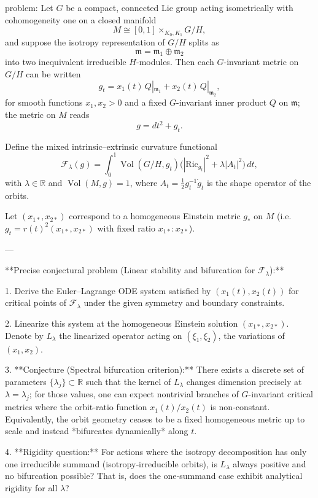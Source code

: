 problem:  
Let \(G\) be a compact, connected Lie group acting isometrically with cohomogeneity one on a closed manifold  
\[
M \cong [0,1]\times_{K_0,K_1} G/H,
\]
and suppose the isotropy representation of \(G/H\) splits as
\[
\mathfrak{m} = \mathfrak{m}_1 \oplus \mathfrak{m}_2
\]
into two inequivalent irreducible \(H\)-modules.  
Then each \(G\)-invariant metric on \(G/H\) can be written  
\[
g_t = x_1(t)\, Q|_{\mathfrak{m}_1} + x_2(t)\, Q|_{\mathfrak{m}_2},
\]
for smooth functions \(x_1,x_2>0\) and a fixed \(G\)-invariant inner product \(Q\) on \(\mathfrak{m}\); the metric on \(M\) reads
\[
g = dt^2 + g_t .
\]

Define the mixed intrinsic–extrinsic curvature functional
\[
\mathcal{F}_\lambda(g) = \int_0^1 \! \operatorname{Vol}(G/H,g_t) \Big( |\mathrm{Ric}_{g_t}|^2 + 
   \lambda |A_t|^2 \Big)\,dt,
\]
with \(\lambda \in \mathbb{R}\) and \(\operatorname{Vol}(M,g)=1\),  
where \(A_t=\frac12 g_t^{-1}\dot g_t\) is the shape operator of the orbits.

Let \((x_{1*},x_{2*})\) correspond to a homogeneous Einstein metric \(g_*\) on \(M\)
(i.e. \(g_t = r(t)^2(x_{1*},x_{2*})\) with fixed ratio \(x_{1*}:x_{2*}\)).  

---

**Precise conjectural problem (Linear stability and bifurcation for \(\mathcal{F}_\lambda\)):**

1.  Derive the Euler–Lagrange ODE system satisfied by \((x_1(t),x_2(t))\) for critical points of \(\mathcal{F}_\lambda\) under the given symmetry and boundary constraints.

2.  Linearize this system at the homogeneous Einstein solution \((x_{1*},x_{2*})\).  
    Denote by \(L_\lambda\) the linearized operator acting on \((\xi_1,\xi_2)\), the variations of \((x_1,x_2)\).

3.  **Conjecture (Spectral bifurcation criterion):**  
    There exists a discrete set of parameters \( \{\lambda_j\} \subset \mathbb{R} \) such that the kernel of \(L_\lambda\) changes dimension precisely at \(\lambda = \lambda_j\);  
    for those values, one can expect nontrivial branches of \(G\)-invariant critical metrics where the orbit‑ratio function \(x_1(t)/x_2(t)\) is non‑constant.  
    Equivalently, the orbit geometry ceases to be a fixed homogeneous metric up to scale and instead *bifurcates dynamically* along \(t\).

4.  **Rigidity question:**  
    For actions where the isotropy decomposition has only one irreducible summand (isotropy‑irreducible orbits), is \(L_\lambda\) always positive and no bifurcation possible?  
    That is, does the one‑summand case exhibit analytical rigidity for all \(\lambda\)?

